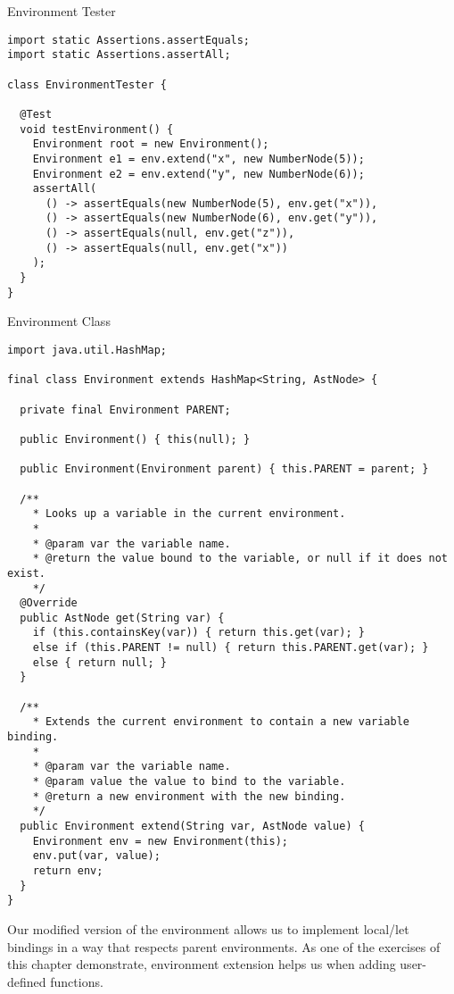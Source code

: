 \begin{cl}{Environment Tester}
\begin{lstlisting}[language=MyJava]
import static Assertions.assertEquals;
import static Assertions.assertAll;

class EnvironmentTester {
  
  @Test
  void testEnvironment() {
    Environment root = new Environment();
    Environment e1 = env.extend("x", new NumberNode(5));
    Environment e2 = env.extend("y", new NumberNode(6));
    assertAll(
      () -> assertEquals(new NumberNode(5), env.get("x")),
      () -> assertEquals(new NumberNode(6), env.get("y")),
      () -> assertEquals(null, env.get("z")),
      () -> assertEquals(null, env.get("x"))
    );
  }
}
\end{lstlisting}
\end{cl}
  
\begin{cl}{Environment Class}
\begin{lstlisting}[language=MyJava]
import java.util.HashMap;

final class Environment extends HashMap<String, AstNode> {

  private final Environment PARENT;

  public Environment() { this(null); }

  public Environment(Environment parent) { this.PARENT = parent; }

  /**
    * Looks up a variable in the current environment.
    * 
    * @param var the variable name.
    * @return the value bound to the variable, or null if it does not exist.
    */
  @Override
  public AstNode get(String var) {
    if (this.containsKey(var)) { return this.get(var); }
    else if (this.PARENT != null) { return this.PARENT.get(var); }
    else { return null; }
  }

  /**
    * Extends the current environment to contain a new variable binding.
    * 
    * @param var the variable name.
    * @param value the value to bind to the variable.
    * @return a new environment with the new binding.
    */
  public Environment extend(String var, AstNode value) {
    Environment env = new Environment(this);
    env.put(var, value);
    return env;
  }
}
\end{lstlisting}
\end{cl} 

Our modified version of the environment allows us to implement local/let bindings in a way that respects parent environments. As one of the exercises of this chapter demonstrate, environment extension helps us when adding user-defined functions.

